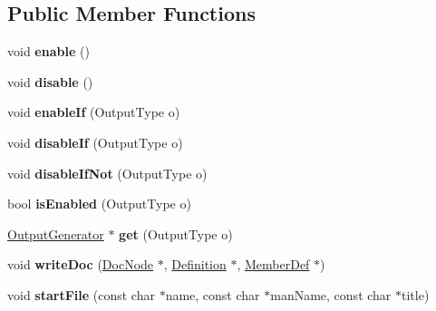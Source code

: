 \subsection*{Public Member Functions}
\begin{DoxyCompactItemize}
\item 
\mbox{\label{class_man_generator_a952257b104ee73181e50ac3617e6c8ba}} 
void {\bfseries enable} ()
\item 
\mbox{\label{class_man_generator_a8e677c969a92c05ad55e89383215e9a4}} 
void {\bfseries disable} ()
\item 
\mbox{\label{class_man_generator_a6a9253a0f036c4f8fbb9c8dc908d36e2}} 
void {\bfseries enable\+If} (Output\+Type o)
\item 
\mbox{\label{class_man_generator_a3730f076f025f7969c1e804c553a1201}} 
void {\bfseries disable\+If} (Output\+Type o)
\item 
\mbox{\label{class_man_generator_a840a5fe6338fc2ff32570933e6a6b741}} 
void {\bfseries disable\+If\+Not} (Output\+Type o)
\item 
\mbox{\label{class_man_generator_ab1988ae55ad31aa4314452d277cd8d47}} 
bool {\bfseries is\+Enabled} (Output\+Type o)
\item 
\mbox{\label{class_man_generator_a00f9039d2fae7e493948ade8f7ba4062}} 
\mbox{\hyperlink{class_output_generator}{Output\+Generator}} $\ast$ {\bfseries get} (Output\+Type o)
\item 
\mbox{\label{class_man_generator_adfcb88add542e7342f4b8c3faa737511}} 
void {\bfseries write\+Doc} (\mbox{\hyperlink{class_doc_node}{Doc\+Node}} $\ast$, \mbox{\hyperlink{class_definition}{Definition}} $\ast$, \mbox{\hyperlink{class_member_def}{Member\+Def}} $\ast$)
\item 
\mbox{\label{class_man_generator_a694e4eb58c60cf927b2dc0b764756274}} 
void {\bfseries start\+File} (const char $\ast$name, const char $\ast$man\+Name, const char $\ast$title)
\item 

\end{DoxyCompactItemize}

